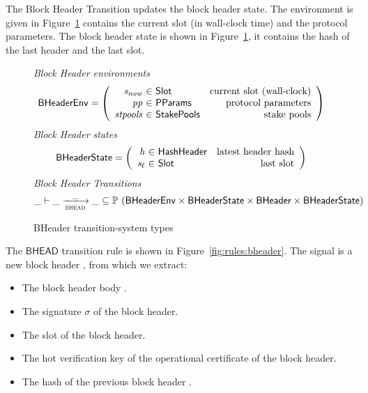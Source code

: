 The Block Header Transition updates the block header state. The environment is
given in Figure~\ref{fig:ts-types:bheader} contains the current slot (in
wall-clock time) and the protocol parameters. The block header state is shown in
Figure~\ref{fig:ts-types:bheader}, it contains the hash of the last header and
the last slot.

\begin{figure}
  \emph{Block Header environments}
  \begin{equation*}
    \BHeaderEnv =
    \left(
      \begin{array}{r@{~\in~}lr}
        \var{s_{now}} & \Slot & \text{current slot (wall-clock)} \\
        \var{pp} & \PParams & \text{protocol parameters} \\
        \var{stpools} & \StakePools & \text{stake pools} \\
      \end{array}
    \right)
  \end{equation*}
  \emph{Block Header states}
  \begin{equation*}
    \BHeaderState =
    \left(
      \begin{array}{r@{~\in~}lr}
        \var{h} & \HashHeader & \text{latest header hash} \\
        \var{s_\ell} & \Slot & \text{last slot} \\
      \end{array}
    \right)
  \end{equation*}
  \emph{Block Header Transitions}
  \begin{equation*}
    \_ \vdash \var{\_} \trans{bhead}{\_} \var{\_} \subseteq
    \powerset (\BHeaderEnv \times \BHeaderState \times \BHeader \times \BHeaderState)
  \end{equation*}
  \caption{BHeader transition-system types}
  \label{fig:ts-types:bheader}
\end{figure}

The $\mathsf{BHEAD}$ transition rule is shown in Figure~\ref{fig:rules:bheader}.
The signal is a new block header , from which we extract:

\begin{itemize}
\item The block header body .
\item The signature $\sigma$ of the block header.
\item The slot  of the block header.
\item The hot verification key  of the operational certificate of
  the block header.
\item The hash of the previous block header .
\end{itemize}

